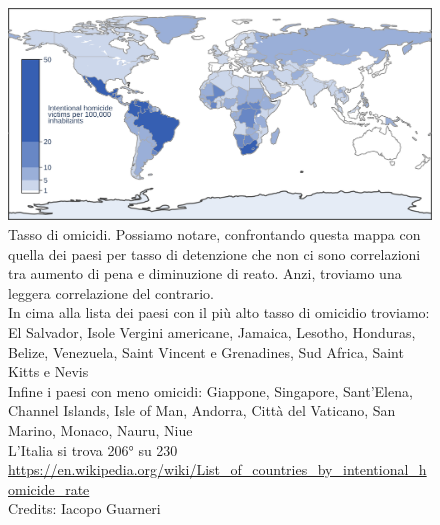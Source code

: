 \documentclass[12pt]{book} %
\begin{document}
\begin{figure}[H]
  \begin{minipage}{17cm}
    \includegraphics[width=17cm]{images/Libro-img038.png}
    \caption{Tasso di omicidi. Possiamo notare, confrontando questa
mappa con quella dei paesi per tasso di detenzione che non ci sono correlazioni tra aumento di pena e diminuzione di
reato. Anzi, troviamo una leggera correlazione del contrario.\\
In cima alla lista dei paesi con il più alto tasso di omicidio troviamo: El Salvador, Isole Vergini americane, Jamaica,
Lesotho, Honduras, Belize, Venezuela, Saint Vincent e Grenadines, Sud Africa, Saint Kitts e Nevis\\
Infine i paesi con meno omicidi: Giappone, Singapore, Sant'Elena, Channel Islands, Isle of Man,
Andorra, Città del Vaticano, San Marino, Monaco, Nauru, Niue\\
L'Italia si trova 206° su 230\\
\protect\url{https://en.wikipedia.org/wiki/List\_of\_countries\_by\_intentional\_homicide\_rate} \\
Credits: Iacopo Guarneri}
  \end{minipage}
\end{figure} 
\end{document}

